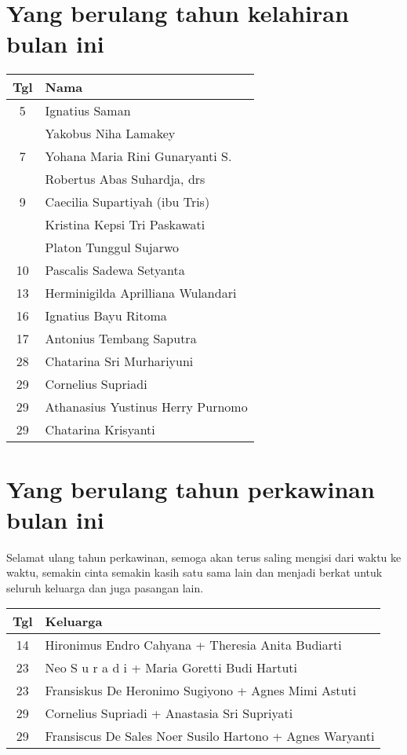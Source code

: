 
\section*{Yang berulang tahun kelahiran bulan ini}


\begin{longtable}{|c|l|} 
\hline Tgl & Nama \\ \hline
5 & Ignatius Saman \\  
 & Yakobus Niha Lamakey \\  
7 & Yohana Maria Rini Gunaryanti S. \\ 
 & Robertus Abas Suhardja, drs \\ 
9 & Caecilia Supartiyah (ibu Tris) \\ 
 & Kristina Kepsi Tri Paskawati \\ 
 & Platon Tunggul Sujarwo \\  
10 & Pascalis Sadewa Setyanta \\ 
13 & Herminigilda Aprilliana Wulandari \\
16 & Ignatius Bayu Ritoma \\ 
17 & Antonius Tembang Saputra \\ 
28 & Chatarina Sri Murhariyuni \\ 
29 & Cornelius Supriadi \\ 
29 & Athanasius Yustinus Herry Purnomo \\ 
29 & Chatarina Krisyanti \\ \hline 
\end{longtable}
 
\section*{Yang berulang tahun perkawinan  bulan ini}

Selamat ulang tahun perkawinan, semoga akan terus saling mengisi dari waktu ke waktu, semakin cinta semakin kasih satu sama lain dan menjadi berkat untuk seluruh keluarga dan juga pasangan lain.

\begin{longtable}{|c|l|} 
\hline Tgl & Keluarga \\ \hline
14 & Hironimus Endro Cahyana + Theresia Anita Budiarti \\  
23 & Neo S u r a d i + Maria Goretti Budi Hartuti \\
23 & Fransiskus De Heronimo Sugiyono + Agnes Mimi Astuti\\  
29 & Cornelius Supriadi + Anastasia Sri Supriyati \\ 
29 & Fransiscus De Sales Noer Susilo Hartono + Agnes Waryanti\\ \hline  
\end{longtable}

\begin{center}
{}
\end{center}
